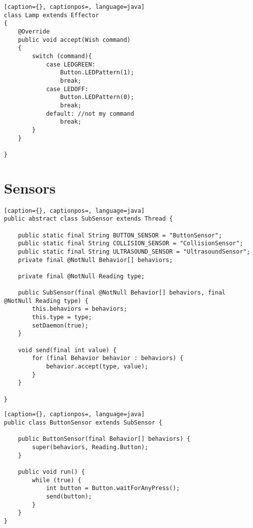 \begin{lstlisting}[caption={}, captionpos=, language=java]
class Lamp extends Effector
{
	@Override
	public void accept(Wish command)
	{
		switch (command){
			case LEDGREEN:
				Button.LEDPattern(1);
				break;
			case LEDOFF:
				Button.LEDPattern(0);
				break;
			default: //not my command
				break;
		}
	}

}
\end{lstlisting}

\section{Sensors}

\begin{lstlisting}[caption={}, captionpos=, language=java]
public abstract class SubSensor extends Thread {

	public static final String BUTTON_SENSOR = "ButtonSensor";
	public static final String COLLISION_SENSOR = "CollisionSensor";
	public static final String ULTRASOUND_SENSOR = "UltrasoundSensor";
	private final @NotNull Behavior[] behaviors;

	private final @NotNull Reading type;

	public SubSensor(final @NotNull Behavior[] behaviors, final @NotNull Reading type) {
		this.behaviors = behaviors;
		this.type = type;
		setDaemon(true);
	}

	void send(final int value) {
		for (final Behavior behavior : behaviors) {
			behavior.accept(type, value);
		}
	}

}
\end{lstlisting}

\begin{lstlisting}[caption={}, captionpos=, language=java]
public class ButtonSensor extends SubSensor {

    public ButtonSensor(final Behavior[] behaviors) {
        super(behaviors, Reading.Button);
    }

    public void run() {
        while (true) {
            int button = Button.waitForAnyPress();
            send(button);
        }
    }
}
\end{lstlisting}

